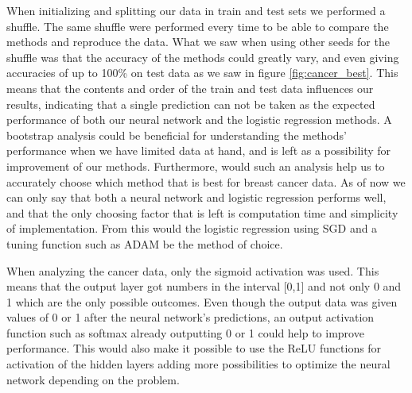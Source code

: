 \documentclass[11pt]{article}
\begin{document}
When initializing and splitting our data in train and test sets we performed a shuffle. The same shuffle were performed every time to be able to compare the methods and reproduce the data. What we saw when using other seeds for the shuffle was that the accuracy of the methods could greatly vary, and even giving accuracies of up to 100\% on test data as we saw in figure \ref{fig:cancer_best}. This means that the contents and order of the train and test data influences our results, indicating that a single prediction can not be taken as the expected performance of both our neural network and the logistic regression methods. A bootstrap analysis could be beneficial for understanding the methods' performance when we have limited data at hand, and is left as a possibility for improvement of our methods. Furthermore, would such an analysis help us to accurately choose which method that is best for breast cancer data. As of now we can only say that both a neural network and logistic regression performs well, and that the only choosing factor that is left is computation time and simplicity of implementation. From this would the logistic regression using SGD and a tuning function such as ADAM be the method of choice.

When analyzing the cancer data, only the sigmoid activation was used. This means that the output layer got numbers in the interval [0,1] and not only 0 and 1 which are the only possible outcomes. Even though the output data was given values of 0 or 1 after the neural network's predictions, an output activation function such as softmax already outputting 0 or 1 could help to improve performance. This would also make it possible to use the ReLU functions for activation of the hidden layers adding more possibilities to optimize the neural network depending on the problem.
\end{document}
